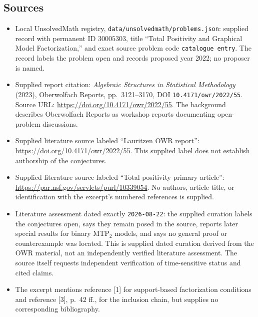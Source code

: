 \documentclass[11pt]{article}
\begin{document}
\subsection{Sources}
\begin{itemize}
\item Local UnsolvedMath registry, \texttt{data/unsolvedmath/problems.json}: supplied record with permanent ID \(30005303\), title ``Total Positivity and Graphical Model Factorization,'' and exact source problem code \texttt{catalogue entry}. The record labels the problem open and records proposed year 2022; no proposer is named.
\item Supplied report citation: \emph{Algebraic Structures in Statistical Methodology} (2023), Oberwolfach Reports, pp.\ 3121--3170, DOI \texttt{10.4171/owr/2022/55}. Source URL: \url{https://doi.org/10.4171/owr/2022/55}. The background describes Oberwolfach Reports as workshop reports documenting open-problem discussions.
\item Supplied literature source labeled ``Lauritzen OWR report'': \url{https://doi.org/10.4171/owr/2022/55}. This supplied label does not establish authorship of the conjectures.
\item Supplied literature source labeled ``Total positivity primary article'': \url{https://par.nsf.gov/servlets/purl/10339054}. No authors, article title, or identification with the excerpt's numbered references is supplied.
\item Literature assessment dated exactly \texttt{2026-08-22}: the supplied curation labels the conjectures open, says they remain posed in the source, reports later special results for binary MTP\(_2\) models, and says no general proof or counterexample was located. This is supplied dated curation derived from the OWR material, not an independently verified literature assessment. The source itself requests independent verification of time-sensitive status and cited claims.
\item The excerpt mentions reference [1] for support-based factorization conditions and reference [3], p.\ 42 ff., for the inclusion chain, but supplies no corresponding bibliography.
\end{itemize}
\end{document}
